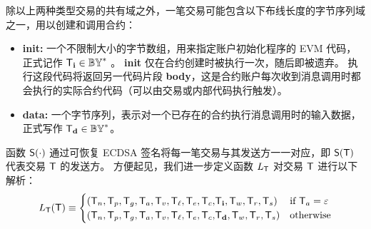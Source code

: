 \smallskip
除以上两种类型交易的共有域之外，一笔交易可能包含以下布线长度的字节序列域之一，用以创建和调用合约：
\begin{itemize}[nosep]
 	\item {\bf init:} 
 	一个不限制大小的字节数组，用来指定账户初始化程序的 EVM 代码，正式记作 $\textsf{T}_{\bf i} \in \mathbb{BY}^*$ 。
 	{\bf init} 仅在合约创建时被执行一次，随后即被遗弃。
 	执行这段代码将返回另一代码片段 {\bf body}，这是合约账户每次收到消息调用时都会执行的实际合约代码（可以由交易或内部代码执行触发）。 


 	\item {\bf data:} 一个字节序列，表示对一个已存在的合约执行消息调用时的输入数据，正式写作 $\textsf{T}_{\bf d}\in \mathbb{BY}^*$。

 \end{itemize} 

函数 $\mathsf{S}{\left({\cdot} \right)}$ 通过可恢复 ECDSA 签名将每一笔交易与其发送方一一对应，即 $\mathsf{S}{\left({\textsf{T}} \right)}$ 代表交易 $\textsf{T}$ 的发送方。
%
方便起见，我们进一步定义函数 $L_{\textsf{T}}$ 对交易 $\textsf{T}$ 进行以下解析：
\begin{align}\label{def:tx_prepare}
	L_{\textsf{T}}(\textsf{T})\equiv 
	\begin{cases}
	\left(\textsf{T}_n, \textsf{T}_p, \textsf{T}_g, \textsf{T}_a, \textsf{T}_v, {\textsf{T}_\ell,\textsf{T}_e,\textsf{T}_c,} \textsf{T}_{\bf i}, \textsf{T}_w,\textsf{T}_r,\textsf{T}_s \right) & \mbox{if $\textsf{T}_a=\mathbb{\varepsilon}$} \\
	\left(\textsf{T}_n, \textsf{T}_p, \textsf{T}_g, \textsf{T}_a, \textsf{T}_v, {\textsf{T}_\ell,\textsf{T}_e,\textsf{T}_c,} \textsf{T}_{\bf d}, \textsf{T}_w,\textsf{T}_r,\textsf{T}_s \right) & \mbox{otherwise}
	\end{cases}
\end{align}

